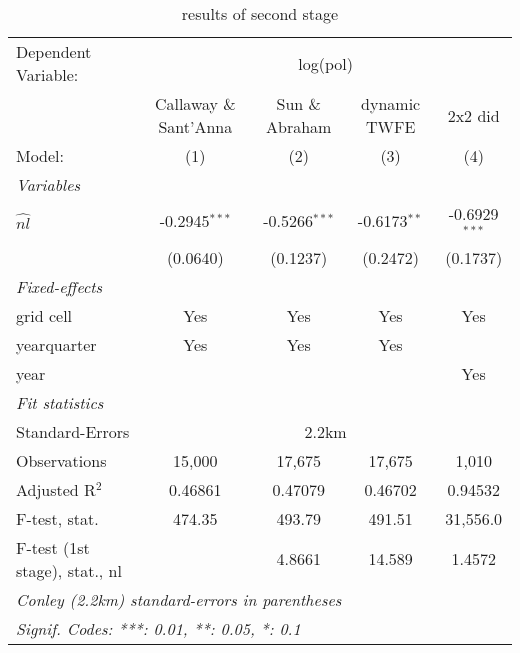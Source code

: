 
\begin{table}[H]
   \caption{\label{tab:estimates} results of second stage}
   \centering
   \begin{adjustbox}{width = \textwidth, center}
      \begin{tabular}{lcccc}
         \tabularnewline \midrule \midrule
         Dependent Variable: & \multicolumn{4}{c}{log(pol)}\\
          & Callaway \& Sant'Anna & Sun \& Abraham & dynamic TWFE &  2x2 did \\ 
         Model:                        & (1)             & (2)             & (3)            & (4)\\  
         \midrule
         \emph{Variables}\\
         $\widehat{nl}$                & -0.2945$^{***}$ & -0.5266$^{***}$ & -0.6173$^{**}$ & -0.6929$^{***}$\\   
                                       & (0.0640)        & (0.1237)        & (0.2472)       & (0.1737)\\   
         \midrule
         \emph{Fixed-effects}\\
         grid cell                     & Yes             & Yes             & Yes            & Yes\\  
         yearquarter                   & Yes             & Yes             & Yes            & \\  
         year                          &                 &                 &                & Yes\\  
         \midrule
         \emph{Fit statistics}\\
         Standard-Errors & \multicolumn{4}{c}{2.2km} \\ 
         Observations                  & 15,000          & 17,675          & 17,675         & 1,010\\  
         Adjusted R$^2$                & 0.46861         & 0.47079         & 0.46702        & 0.94532\\  
         F-test, stat.                 & 474.35          & 493.79          & 491.51         & 31,556.0\\  
         F-test (1st stage), stat., nl &                 & 4.8661          & 14.589         & 1.4572\\  
         \midrule \midrule
         \multicolumn{5}{l}{\emph{Conley (2.2km) standard-errors in parentheses}}\\
         \multicolumn{5}{l}{\emph{Signif. Codes: ***: 0.01, **: 0.05, *: 0.1}}\\
      \end{tabular}
   \end{adjustbox}
\end{table}


